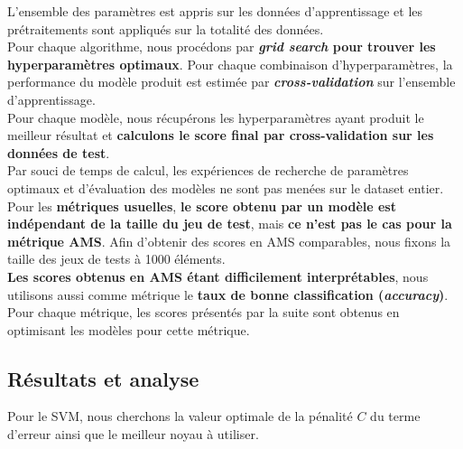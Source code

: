 \documentclass[12pt]{article}
\begin{document}
L'ensemble des paramètres est appris sur les données d'apprentissage et les
prétraitements sont appliqués sur la totalité des données. \\

Pour chaque algorithme, nous procédons par \textbf{\emph{grid search} pour
trouver les hyperparamètres optimaux}. Pour chaque combinaison
d'hyperparamètres, la performance du modèle produit est estimée par
\textbf{\emph{cross-validation}} sur l'ensemble d'apprentissage. \\

Pour chaque modèle, nous récupérons les hyperparamètres ayant produit le
meilleur résultat et \textbf{calculons le score final par cross-validation sur les
données de test}. \\

Par souci de temps de calcul, les expériences de recherche de paramètres
optimaux et d'évaluation des modèles ne sont pas menées sur le dataset entier.
Pour les \textbf{métriques usuelles}, \textbf{le score obtenu par un modèle est
indépendant de la taille du jeu de test}, mais \textbf{ce n'est pas le cas pour
la métrique AMS}.  Afin d'obtenir des scores en AMS comparables, nous fixons la
taille des jeux de tests à 1000 éléments. \\

\textbf{Les scores obtenus en AMS étant difficilement interprétables}, nous
utilisons aussi comme métrique le \textbf{taux de bonne classification
(\emph{accuracy})}. Pour chaque métrique, les scores présentés par la suite sont
obtenus en optimisant les modèles pour cette métrique.

\subsection{Résultats et analyse}


Pour le SVM, nous cherchons la valeur optimale de la pénalité $C$ du terme
d'erreur ainsi que le meilleur noyau à utiliser. 
\end{document}
